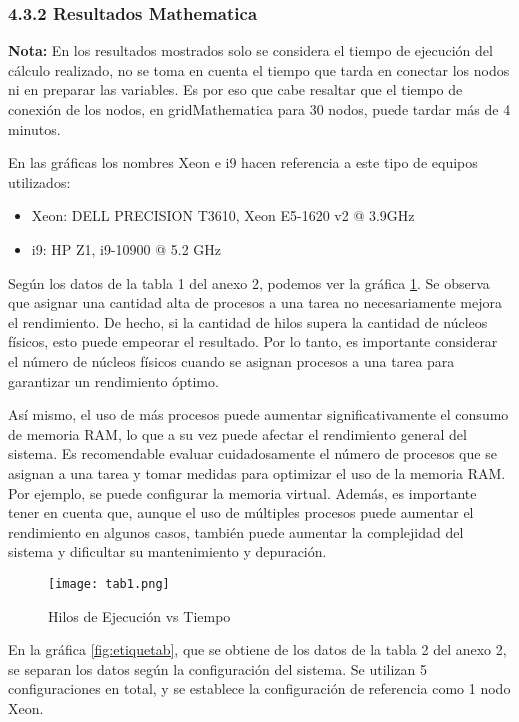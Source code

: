 \begin{spacing}{1.5}
  \subsubsection{4.3.2 Resultados Mathematica}

  \textbf{Nota:} En los resultados mostrados solo se considera el tiempo de ejecución del cálculo realizado, no se toma en cuenta el tiempo que tarda en conectar los nodos ni en preparar las variables. Es por eso que cabe resaltar que el tiempo de conexión de los nodos, en gridMathematica para 30 nodos, puede tardar más de 4 minutos.

  En las gráficas los nombres Xeon e i9 hacen referencia a este tipo de equipos utilizados:

  \begin{itemize}
    \item Xeon: DELL PRECISION T3610, Xeon E5-1620 v2 @ 3.9GHz
    \item i9: HP Z1, i9-10900 @ 5.2 GHz
  \end{itemize}

  Según los datos de la tabla 1 del anexo 2, podemos ver la gráfica \ref{fig:etiquetaa}. Se observa que asignar una cantidad alta de procesos a una tarea no necesariamente mejora el rendimiento. De hecho, si la cantidad de hilos supera la cantidad de núcleos físicos, esto puede empeorar el resultado. Por lo tanto, es importante considerar el número de núcleos físicos cuando se asignan procesos a una tarea para garantizar un rendimiento óptimo.

  Así mismo, el uso de más procesos puede aumentar significativamente el consumo de memoria RAM, lo que a su vez puede afectar el rendimiento general del sistema. Es recomendable evaluar cuidadosamente el número de procesos que se asignan a una tarea y tomar medidas para optimizar el uso de la memoria RAM. Por ejemplo, se puede configurar la memoria virtual. Además, es importante tener en cuenta que, aunque el uso de múltiples procesos puede aumentar el rendimiento en algunos casos, también puede aumentar la complejidad del sistema y dificultar su mantenimiento y depuración.\newpage

  \begin{figure}[h]
    \centering
    \texttt{[image: tab1.png]}
    \caption{Hilos de Ejecución vs Tiempo}
    \label{fig:etiquetaa}
  \end{figure}

  En la gráfica \ref{fig:etiquetab}, que se obtiene de los datos de la tabla 2 del anexo 2, se separan los datos según la configuración del sistema. Se utilizan 5 configuraciones en total, y se establece la configuración de referencia como 1 nodo Xeon.


\end{spacing}
